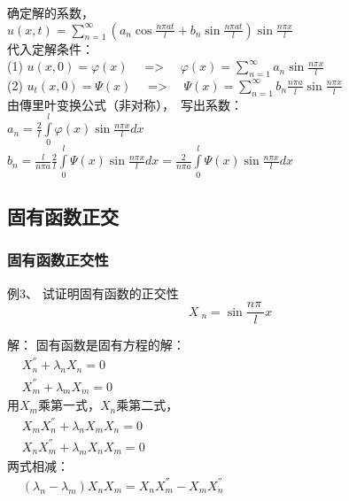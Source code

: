 \begin{frame}
	\frametitle{}	
	确定解的系数，\\
	$ \displaystyle u(x,t)= \sum\limits_{n=1}^{\infty }  (a_n\cos\frac{ n\pi at}{l}+ b_n\sin \frac{ n\pi at}{l}) \sin \frac{ n\pi x}{l}$\\
	代入定解条件：\\ 
	(1) $ \displaystyle u(x,0)= \varphi (x)$ ~~=> ~~$\varphi (x)=\sum_{n=1}^{\infty } a_n \sin \frac{ n\pi x}{l}$\\  
	(2) $ \displaystyle u_t(x,0)= \Psi (x)$ ~~=> ~~$\Psi (x)=\sum_{n=1}^{\infty } b_n \frac{ n\pi a}{l} \sin \frac{ n\pi x}{l}$ \\  \vspace{0.3cm}
	由傳里叶变换公式（非对称）， 写出系数：\\  
	$ \displaystyle a_n=  \frac{2}{l}\int\limits_{0 }^{l}  \varphi (x) \sin \frac{ n\pi x}{l} dx $\\   
	$ \displaystyle b_n= \frac{l} { n\pi a} \frac{2}{l}\int\limits_{0 }^{l}  \Psi  (x) \sin \frac{ n\pi x}{l} dx =  \frac{2} { n\pi a}  \int\limits_{0 }^{l}  \Psi  (x) \sin \frac{ n\pi x}{l} dx$\\   
\end{frame}	



\subsection{固有函数正交}
\begin{frame}
	\frametitle{固有函数正交性}	
	\begin{exampleblock} {例3、	试证明固有函数的正交性}
		\begin{equation*}
			X~_n= \sin \frac{n\pi~}{l} x  
		\end{equation*}
	\end{exampleblock} 	
	\alert{解：} 固有函数是固有方程的解：\\
	$\begin{array}{llll}
		&X_n ^{''}+\lambda_n X_n=0\\
		&X_m ^{''}+\lambda_m X_m=0
	\end{array}$ \\ 
	用$X_m$乘第一式，$X_n$乘第二式，\\
	$\begin{array}{llll}
		&X_m X_n ^{''}+\lambda_n X_m X_n=0\\
		&X_nX_m ^{''}+\lambda_m X_n X_m=0
	\end{array}$ \\ 
	两式相减：\\
	$\begin{array}{llll}
		& (\lambda_n-\lambda_m) X_n X_m= X_nX_m ^{''}-X_mX_n ^{''} 
	\end{array}$ \\ 
\end{frame}	

